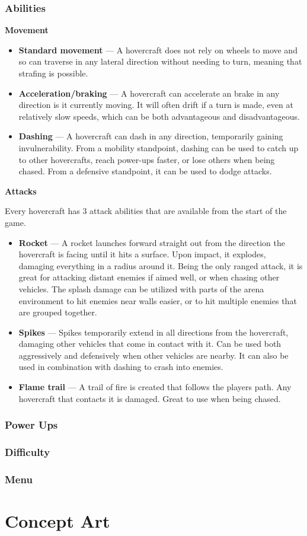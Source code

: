 \documentclass{article}
\theoremstyle{definition}
\begin{document}
\subsubsection{Abilities}

\textbf{Movement}

\begin{itemize}
  \item \textbf{Standard movement} --- A hovercraft does not rely on wheels to
    move and so can traverse in any lateral direction without needing to turn,
    meaning that strafing is possible.
  \item \textbf{Acceleration/braking} --- A hovercraft can accelerate an brake
    in any direction is it currently moving. It will often drift if a turn is
    made, even at relatively slow speeds, which can be both advantageous and
    disadvantageous.
  \item \textbf{Dashing} --- A hovercraft can dash in any direction,
    temporarily gaining invulnerability. From a mobility standpoint, dashing
    can be used to catch up to other hovercrafts, reach power-ups faster, or
    lose others when being chased. From a defensive standpoint, it can be used
    to dodge attacks.
\end{itemize}

\textbf{Attacks}

Every hovercraft has 3 attack abilities that are available from the start of the game.

\begin{itemize}
  \item \textbf{Rocket} --- A rocket launches forward straight out from the
    direction the hovercraft is facing until it hits a surface. Upon impact, it
    explodes, damaging everything in a radius around it. Being the only ranged
    attack, it is great for attacking distant enemies if aimed well, or when
    chasing other vehicles. The splash damage can be utilized with parts of the
    arena environment to hit enemies near walls easier, or to hit multiple
    enemies that are grouped together.
  \item \textbf{Spikes} --- Spikes temporarily extend in all directions from
    the hovercraft, damaging other vehicles that come in contact with it. Can be
    used both aggressively and defensively when other vehicles are nearby. It
    can also be used in combination with dashing to crash into enemies.
  \item \textbf{Flame trail} --- A trail of fire is created that follows the
    players path. Any hovercraft that contacts it is damaged. Great to use when
    being chased.
\end{itemize}


\subsubsection{Power Ups}
\subsubsection{Difficulty}
\subsubsection{Menu}

\section{Concept Art}
\end{document}
